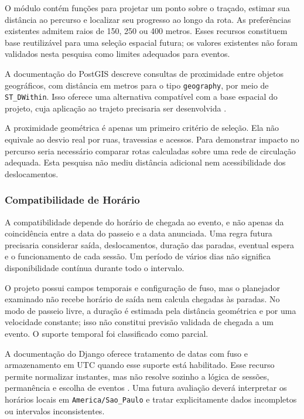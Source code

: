 O módulo  contém funções para projetar um ponto sobre o traçado, estimar sua distância ao percurso e localizar seu progresso ao longo da rota. As preferências existentes admitem raios de 150, 250 ou 400 metros. Esses recursos constituem base reutilizável para uma seleção espacial futura; os valores existentes não foram validados nesta pesquisa como limites adequados para eventos.

A documentação do PostGIS descreve consultas de proximidade entre objetos geográficos, com distância em metros para o tipo \texttt{geography}, por meio de \texttt{ST\_DWithin}. Isso oferece uma alternativa compatível com a base espacial do projeto, cuja aplicação ao trajeto precisaria ser desenvolvida \parencite{postgis2026}.

A proximidade geométrica é apenas um primeiro critério de seleção. Ela não equivale ao desvio real por ruas, travessias e acessos. Para demonstrar impacto no percurso seria necessário comparar rotas calculadas sobre uma rede de circulação adequada. Esta pesquisa não mediu distância adicional nem acessibilidade dos deslocamentos.

\subsubsection{Compatibilidade de Horário}

A compatibilidade depende do horário de chegada ao evento, e não apenas da coincidência entre a data do passeio e a data anunciada. Uma regra futura precisaria considerar saída, deslocamentos, duração das paradas, eventual espera e o funcionamento de cada sessão. Um período de vários dias não significa disponibilidade contínua durante todo o intervalo.

O projeto possui campos temporais e configuração de fuso, mas o planejador examinado não recebe horário de saída nem calcula chegadas às paradas. No modo de passeio livre, a duração é estimada pela distância geométrica e por uma velocidade constante; isso não constitui previsão validada de chegada a um evento. O suporte temporal foi classificado como parcial.

A documentação do Django oferece tratamento de datas com fuso e armazenamento em UTC quando esse suporte está habilitado. Esse recurso permite normalizar instantes, mas não resolve sozinho a lógica de sessões, permanência e escolha de eventos \parencite{django2026timezone}. Uma futura avaliação deverá interpretar os horários locais em \texttt{America/Sao\_Paulo} e tratar explicitamente dados incompletos ou intervalos inconsistentes.

